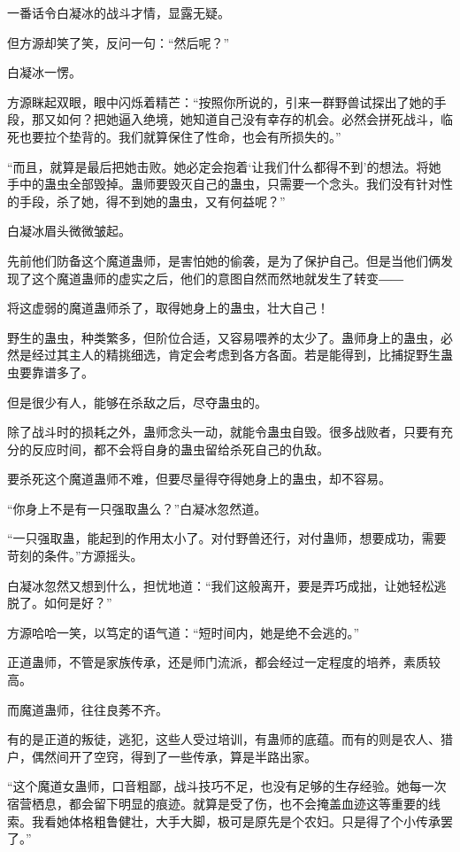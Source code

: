 \begin{this_body}
一番话令白凝冰的战斗才情，显露无疑。

但方源却笑了笑，反问一句：“然后呢？”

白凝冰一愣。

方源眯起双眼，眼中闪烁着精芒：“按照你所说的，引来一群野兽试探出了她的手段，那又如何？把她逼入绝境，她知道自己没有幸存的机会。必然会拼死战斗，临死也要拉个垫背的。我们就算保住了性命，也会有所损失的。”

“而且，就算是最后把她击败。她必定会抱着‘让我们什么都得不到’的想法。将她手中的蛊虫全部毁掉。蛊师要毁灭自己的蛊虫，只需要一个念头。我们没有针对性的手段，杀了她，得不到她的蛊虫，又有何益呢？”

白凝冰眉头微微皱起。

先前他们防备这个魔道蛊师，是害怕她的偷袭，是为了保护自己。但是当他们俩发现了这个魔道蛊师的虚实之后，他们的意图自然而然地就发生了转变――

将这虚弱的魔道蛊师杀了，取得她身上的蛊虫，壮大自己！

野生的蛊虫，种类繁多，但阶位合适，又容易喂养的太少了。蛊师身上的蛊虫，必然是经过其主人的精挑细选，肯定会考虑到各方各面。若是能得到，比捕捉野生蛊虫要靠谱多了。

但是很少有人，能够在杀敌之后，尽夺蛊虫的。

除了战斗时的损耗之外，蛊师念头一动，就能令蛊虫自毁。很多战败者，只要有充分的反应时间，都不会将自身的蛊虫留给杀死自己的仇敌。

要杀死这个魔道蛊师不难，但要尽量得夺得她身上的蛊虫，却不容易。

“你身上不是有一只强取蛊么？”白凝冰忽然道。

“一只强取蛊，能起到的作用太小了。对付野兽还行，对付蛊师，想要成功，需要苛刻的条件。”方源摇头。

白凝冰忽然又想到什么，担忧地道：“我们这般离开，要是弄巧成拙，让她轻松逃脱了。如何是好？”

方源哈哈一笑，以笃定的语气道：“短时间内，她是绝不会逃的。”

正道蛊师，不管是家族传承，还是师门流派，都会经过一定程度的培养，素质较高。

而魔道蛊师，往往良莠不齐。

有的是正道的叛徒，逃犯，这些人受过培训，有蛊师的底蕴。而有的则是农人、猎户，偶然间开了空窍，得到了一些传承，算是半路出家。

“这个魔道女蛊师，口音粗鄙，战斗技巧不足，也没有足够的生存经验。她每一次宿营栖息，都会留下明显的痕迹。就算是受了伤，也不会掩盖血迹这等重要的线索。我看她体格粗鲁健壮，大手大脚，极可是原先是个农妇。只是得了个小传承罢了。”


\end{this_body}
